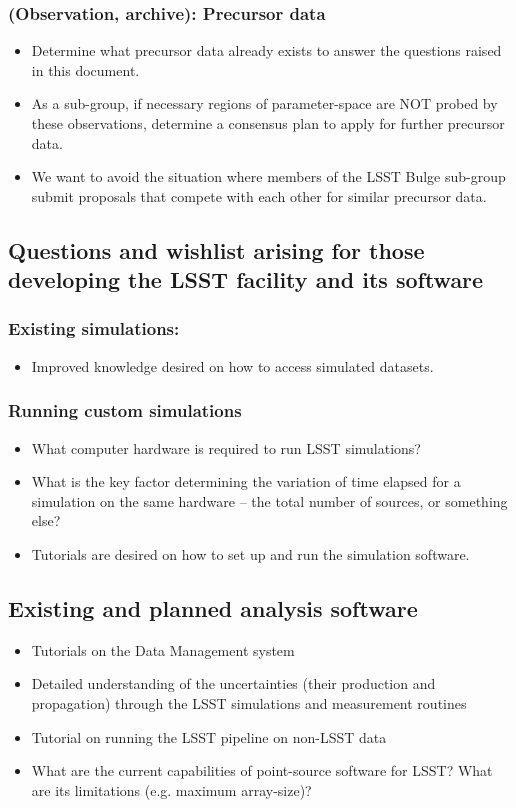 \subsubsection{(Observation, archive): Precursor data }
\begin{itemize}
\item{Determine what precursor data already exists to answer the questions raised in this document. }
\item{As a sub-group, if necessary regions of parameter-space are NOT probed by these observations, 
determine a consensus plan to apply for further precursor data. }
\item{We want to avoid the situation where members of the LSST Bulge sub-group submit proposals 
that compete with each other for similar precursor data. }
\end{itemize}

\subsection{Questions and wishlist arising for those developing the LSST facility and its software}
\subsubsection{Existing simulations: }
\begin{itemize}
\item Improved knowledge desired on how to access simulated datasets. 
\end{itemize}

\subsubsection{Running custom simulations }
\begin{itemize}
\item What computer hardware is required to run LSST simulations? 
\item{What is the key factor determining the variation of time elapsed for a simulation on the same hardware 
-- the total number of sources, or something else? }
\item{Tutorials are desired on how to set up and run the simulation software. }
\end{itemize}

\subsection{Existing and planned analysis software }
\begin{itemize}
\item Tutorials on the Data Management system 
\item{Detailed understanding of the uncertainties (their production and propagation) through the LSST 
simulations and measurement routines }
\item{Tutorial on running the LSST pipeline on non-LSST data }
\item{What are the current capabilities of point-source software for LSST? What are its limitations (e.g. 
maximum array-size)? }
\end{itemize}

